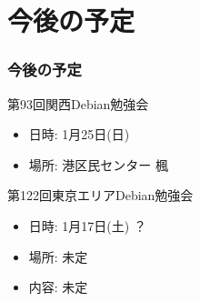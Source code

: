 \documentclass[cjk,dvipdfmx,10pt,compress,%
hyperref={bookmarks=true,bookmarksnumbered=true,bookmarksopen=false,%
colorlinks=false,%
pdftitle={第 92 回 関西 Debian 勉強会},%
pdfauthor={倉敷・のがた・佐々木・かわだ},%
pdfsubject={資料},%
}]{beamer}
\begin{document}

\section{今後の予定}
\begin{frame}[fragile]
\frametitle{今後の予定}

\begin{block}{第93回関西Debian勉強会}
  \begin{itemize}
  \item 日時: 1月25日(日)
  \item 場所: 港区民センター 楓
  \end{itemize}
\end{block}

\begin{block}{第122回東京エリアDebian勉強会}
  \begin{itemize}
  \item 日時: 1月17日(土) ？
  \item 場所: 未定
  \item 内容: 未定
  \end{itemize}
\end{block}

\end{frame}

\takahashi[50]{  }
\end{document}
